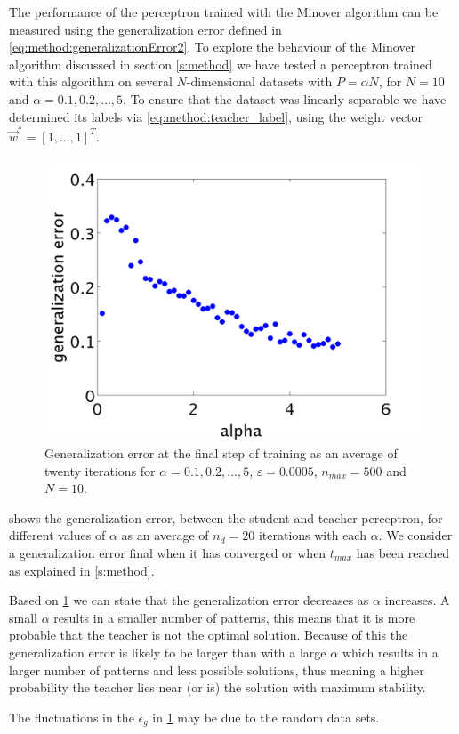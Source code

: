 The performance of the perceptron trained with the Minover algorithm can be measured using the generalization error defined in \autoref{eq:method:generalizationError2}. To explore the behaviour of the Minover algorithm discussed in section \ref{s:method} we have tested a perceptron trained with this algorithm on several $N$-dimensional datasets with $P = \alpha N$, for $N = 10$ and $\alpha = 0.1, 0.2, \dotsc, 5$. To ensure that the dataset was linearly separable we have determined its labels via \eqref{eq:method:teacher_label}, using the weight vector $\vec{w}^* = [1, \dotsc, 1]^T$.\\

\begin{figure}[b]
	\centering
	\includegraphics[width=0.9\columnwidth]{./img/finalgeneralizationerrors}
	\caption{Generalization error at the final step of training as an average of twenty iterations for $\alpha = 0.1, 0.2, \dotsc, 5$, $\varepsilon = 0.0005$, $n_{max} = 500$ and $N = 10$.}
	\label{fig:exp:finalgeneralizationError}
\end{figure}

 shows the generalization error, between the student and teacher perceptron, for different values of $\alpha$ as an average of $n_d = 20$ iterations with each $\alpha$. We consider a generalization error final when it has converged or when $t_{max}$ has been reached as explained in \cref{s:method}. 

Based on \cref{fig:exp:finalgeneralizationError} we can state that the generalization error decreases as $\alpha$ increases. A small $\alpha$ results in a smaller number of patterns, this means that it is more probable that the teacher is not the optimal solution. Because of this the generalization error is likely to be larger than with a large $\alpha$ which results in a larger number of patterns and less possible solutions, thus meaning a higher probability the teacher lies near (or is) the solution with maximum stability.

The fluctuations in the $\epsilon_g$ in \cref{fig:exp:finalgeneralizationError} may be due to the random data sets.\\
